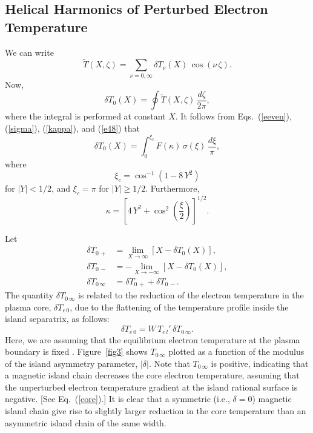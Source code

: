 \documentclass{iopjournal}
\begin{document}
{\subsection{Helical Harmonics of Perturbed Electron Temperature}
We can write
\begin{equation}
\tilde{T}(X,\zeta)=\sum_{\nu=0,\infty}\delta T_\nu(X)\,\cos(\nu\,\zeta).
\end{equation}
Now,
\begin{equation}
\delta T_0(X) = \oint \tilde{T}(X,\zeta)\,\frac{d\zeta}{2\pi},
\end{equation}
where the integral is performed at constant $X$. It follows from Eqs.~(\ref{eeven}), (\ref{sigma}),  (\ref{kappa}), and (\ref{e48}) that
\begin{equation}
\delta T_0(X) = \int_0^{\xi_c}F(\kappa)\,\sigma(\xi)\,\frac{d\xi}{\pi},
\end{equation}
where 
\begin{equation}
\xi_c = \cos^{-1}(1-8\,Y^2)
\end{equation}
for $|Y|<1/2$, and $\xi_c=\pi$ for $|Y|\geq 1/2$. Furthermore,
\begin{equation}
\kappa =\left[4\,Y^2 +\cos^2\left(\frac{\xi}{2}\right)\right]^{1/2}.
\end{equation}

Let 
\begin{align}\label{e79}
\delta T_{0\,+} &=\lim_{X\rightarrow \infty}\left[X - \delta T_0(X)\right],\\[0.5ex]
\delta T_{0\,-} &=-\lim_{X\rightarrow -\infty}\left[X - \delta T_0(X)\right],\\[0.5ex]
\delta T_{0\,\infty} &= \delta T_{0\,+}+ \delta T_{0\,-}.
\end{align}
The quantity $\delta T_{0\,\infty}$ is related to the reduction of the electron temperature in the plasma core, $\delta T_{e\,0}$, due to the flattening of the
temperature profile inside the island separatrix, as follows:
\begin{equation}\label{core}
\delta T_{e\,0} = W\,T_{e\,l}'\,\delta T_{0\,\infty}.
\end{equation}
Here, we are assuming that the equilibrium electron temperature at the plasma boundary is fixed \cite{chang}.
Figure~\ref{fig3} shows $T_{0\,\infty}$ plotted as a function of the modulus of the island asymmetry parameter, $|\delta|$.  
Note that $T_{0\,\infty}$ is positive, indicating that a magnetic island chain decreases the core electron temperature, assuming that the
unperturbed electron temperature gradient at the island rational surface is negative. [See Eq.~(\ref{core}).] It is clear that a symmetric (i.e., $\delta=0$) magnetic
island chain give rise to slightly larger reduction in the core temperature than an asymmetric island chain of the same width. 

}
\end{document}
